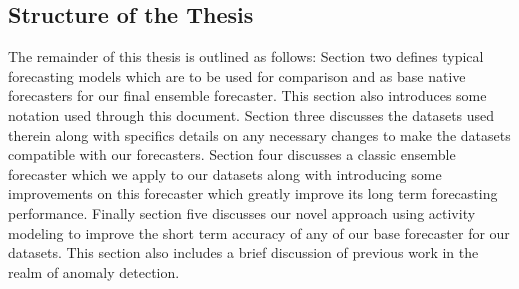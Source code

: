 \subsection{Structure of the Thesis}
The remainder of this thesis is outlined as follows:  Section two defines typical forecasting models which are to be used for comparison and as base native forecasters for our final ensemble forecaster.  This section also introduces some notation used through this document.  Section three discusses the datasets used therein along with specifics details on any necessary changes to make the datasets compatible with our forecasters.  Section four discusses a classic ensemble forecaster which we apply to our datasets along with introducing some improvements on this forecaster which greatly improve its long term forecasting performance.  Finally section five discusses our novel approach using activity modeling to improve the short term accuracy of any of our base forecaster for our datasets.  This section also includes a brief discussion of previous work in the realm of anomaly detection.